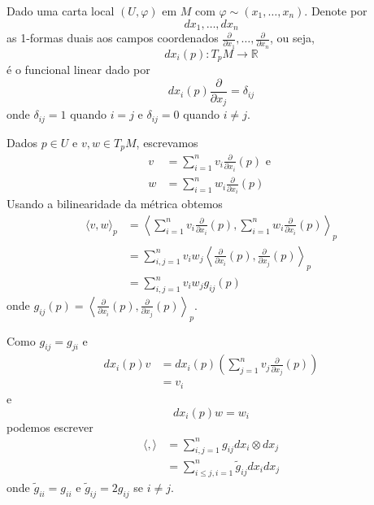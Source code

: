 \begin{observacao}
	Dado uma carta local $(U, \varphi)$ em $M$ com $\varphi \sim (x_1, \ldots, x_n)$. Denote por
	\begin{equation*}
		dx_1, \ldots, dx_n
	\end{equation*}	
	as 1-formas duais aos campos coordenados $\frac{\partial}{\partial x_1}, \ldots, \frac{\partial}{\partial x_n}$, ou seja,
	\begin{equation*}
		dx_i (p): T_p M \rightarrow \mathbb{R}
	\end{equation*}	
	é o funcional linear dado por
	\begin{equation*}
		dx_i (p) \frac{\partial}{\partial x_j} = \delta_{ij}
	\end{equation*}	
	onde $\delta_{ij} = 1$ quando $i=j$ e $\delta_{ij} = 0$ quando $i \neq j$. 
	
	Dados $p \in U$ e $v,w \in T_p M$, escrevamos
	\begin{align*}
		v &= \sum_{i=1}^n v_i \frac{\partial}{\partial x_i}(p) \text{ e }\\
		w &= \sum_{i=1}^n w_i \frac{\partial}{\partial x_i}(p)
	\end{align*}	
	Usando a bilinearidade da métrica obtemos
	\begin{align*}
		\langle v,w \rangle_p &= \left\langle \sum_{i=1}^n v_i \frac{\partial}{\partial x_i}(p), \sum_{i=1}^n w_i \frac{\partial}{\partial x_i}(p) \right\rangle_p\\
		&= \sum_{i,j = 1}^n v_i w_j \left\langle \frac{\partial}{\partial x_i}(p), \frac{\partial}{\partial x_j}(p) \right\rangle_p\\
		&= \sum_{i,j=1}^n v_i w_j g_{ij}(p)
	\end{align*}	
	onde $g_{ij}(p) = \left\langle \frac{\partial}{\partial x_i}(p), \frac{\partial}{\partial x_j}(p) \right\rangle_p$.
	
	Como $g_{ij} = g_{ji}$ e
	\begin{align*}
		dx_i (p) v &= dx_i (p) \left( \sum_{j=1}^n v_j \frac{\partial}{\partial x_j}(p) \right)\\
		&= v_i
	\end{align*}	
	e
	\begin{equation*}
		dx_i (p) w = w_i
	\end{equation*}	
	podemos escrever
	\begin{align*}
		\langle , \rangle &= \sum_{i,j=1}^n g_{ij} dx_i \otimes dx_j\\
		&= \sum_{i \leq j, i=1}^n \tilde{g}_{ij} dx_i dx_j
	\end{align*}	
	onde $\tilde{g}_{ii} = g_{ii} $ e $\tilde{g}_{ij} = 2g_{ij}$ se $i \neq j$.
\end{observacao}

